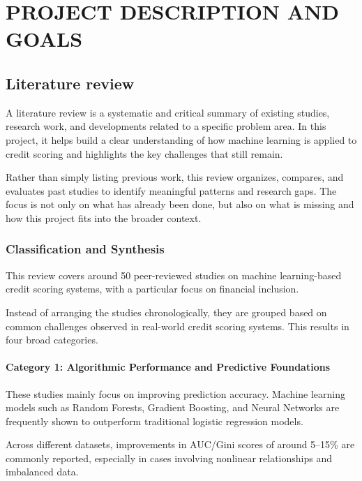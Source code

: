 \chapter{\MakeUppercase{Project Description and Goals}}

\usepackage{longtable}
\usepackage{booktabs}
\usepackage{array}
\usepackage{graphicx}

\section{Literature review}

A literature review is a systematic and critical summary of existing studies, research work, and developments related to a specific problem area. In this project, it helps build a clear understanding of how machine learning is applied to credit scoring and highlights the key challenges that still remain.

Rather than simply listing previous work, this review organizes, compares, and evaluates past studies to identify meaningful patterns and research gaps. The focus is not only on what has already been done, but also on what is missing and how this project fits into the broader context.

\subsection{Classification and Synthesis}

This review covers around 50 peer-reviewed studies on machine learning-based credit scoring systems, with a particular focus on financial inclusion.

Instead of arranging the studies chronologically, they are grouped based on common challenges observed in real-world credit scoring systems. This results in four broad categories.

\subsubsection{Category 1: Algorithmic Performance and Predictive Foundations}

These studies mainly focus on improving prediction accuracy. Machine learning models such as Random Forests, Gradient Boosting, and Neural Networks are frequently shown to outperform traditional logistic regression models.

Across different datasets, improvements in AUC/Gini scores of around 5--15\% are commonly reported, especially in cases involving nonlinear relationships and imbalanced data.


